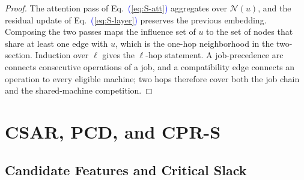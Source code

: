 \documentclass[conference]{IEEEtran}
\theoremstyle{remark}
\newcommand{\Eqref}[1]{\textcolor{blue}{(\ref{#1})}}
\newcommand{\cN}{\mathcal{N}}
\begin{document}
\begin{proof}
The attention pass of Eq.~\Eqref{eq:S-att} aggregates over $\cN(u)$, and the residual update of Eq.~\Eqref{eq:S-layer} preserves the previous embedding. Composing the two passes maps the influence set of $u$ to the set of nodes that share at least one edge with $u$, which is the one-hop neighborhood in the two-section. Induction over $\ell$ gives the $\ell$-hop statement. A job-precedence arc connects consecutive operations of a job, and a compatibility edge connects an operation to every eligible machine; two hops therefore cover both the job chain and the shared-machine competition.
\end{proof}

\section{CSAR, PCD, and CPR-S}
\label{sec:S-decision}

\subsection{Candidate Features and Critical Slack}
\label{sec:S-candidate}
\end{document}
